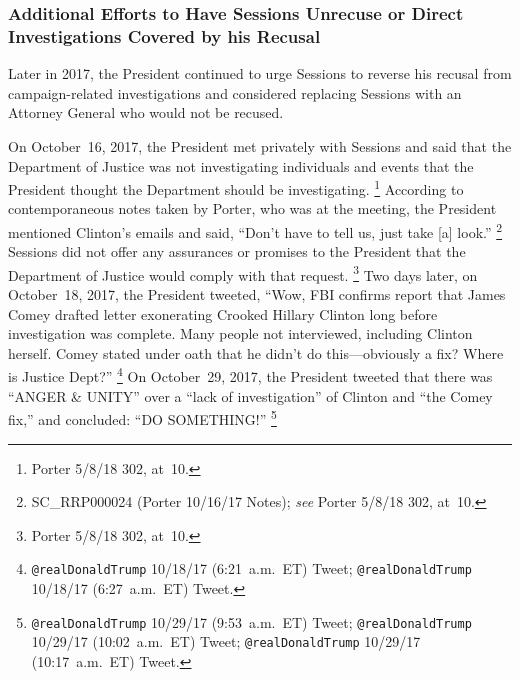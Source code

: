 \subsubsection{Additional Efforts to Have Sessions Unrecuse or Direct Investigations Covered by his Recusal}

Later in 2017, the President continued to urge Sessions to reverse his recusal from campaign-related investigations and considered replacing Sessions with an Attorney General who would not be recused.

On October~16, 2017, the President met privately with Sessions and said that the Department of Justice was not investigating individuals and events that the President thought the Department should be investigating.%
\footnote{Porter 5/8/18 302, at~10.}
According to contemporaneous notes taken by Porter, who was at the meeting, the President mentioned Clinton's emails and said, ``Don't have to tell us, just take [a] look.''%
\footnote{SC\_RRP000024 (Porter 10/16/17 Notes);
\textit{see} Porter 5/8/18 302, at~10.}
Sessions did not offer any assurances or promises to the President that the Department of Justice would comply with that request.%
\footnote{Porter 5/8/18 302, at~10.}
Two days later, on October~18, 2017, the President tweeted, ``Wow, FBI confirms report that James Comey drafted letter exonerating Crooked Hillary Clinton long before investigation was complete.
Many people not interviewed, including Clinton herself.
Comey stated under oath that he didn't do this---obviously a fix?
Where is Justice Dept?''%
\footnote{\verb+@realDonaldTrump+ 10/18/17 (6:21~a.m.~ET) Tweet;
\verb+@realDonaldTrump+ 10/18/17 (6:27~a.m.~ET) Tweet.}
On October~29, 2017, the President tweeted that there was ``ANGER \& UNITY'' over a ``lack of investigation'' of Clinton and ``the Comey fix,'' and concluded: ``DO SOMETHING!''%
\footnote{\verb+@realDonaldTrump+ 10/29/17 (9:53~a.m.~ET) Tweet;
\verb+@realDonaldTrump+ 10/29/17 (10:02~a.m.~ET) Tweet;
\verb+@realDonaldTrump+ 10/29/17 (10:17~a.m.~ET) Tweet.}

